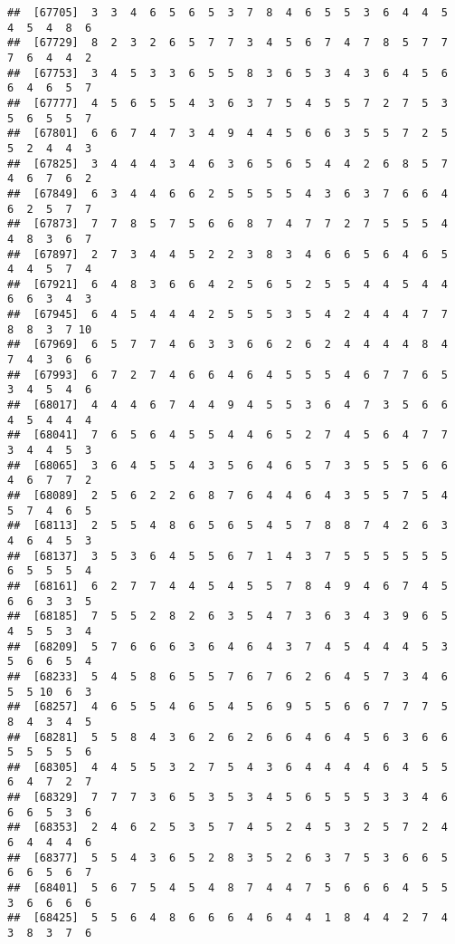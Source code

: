 \documentclass[
]{book}
\begin{document}
\begin{verbatim}
##  [67705]  3  3  4  6  5  6  5  3  7  8  4  6  5  5  3  6  4  4  5  4  5  4  8  6
##  [67729]  8  2  3  2  6  5  7  7  3  4  5  6  7  4  7  8  5  7  7  7  6  4  4  2
##  [67753]  3  4  5  3  3  6  5  5  8  3  6  5  3  4  3  6  4  5  6  6  4  6  5  7
##  [67777]  4  5  6  5  5  4  3  6  3  7  5  4  5  5  7  2  7  5  3  5  6  5  5  7
##  [67801]  6  6  7  4  7  3  4  9  4  4  5  6  6  3  5  5  7  2  5  5  2  4  4  3
##  [67825]  3  4  4  4  3  4  6  3  6  5  6  5  4  4  2  6  8  5  7  4  6  7  6  2
##  [67849]  6  3  4  4  6  6  2  5  5  5  5  4  3  6  3  7  6  6  4  6  2  5  7  7
##  [67873]  7  7  8  5  7  5  6  6  8  7  4  7  7  2  7  5  5  5  4  4  8  3  6  7
##  [67897]  2  7  3  4  4  5  2  2  3  8  3  4  6  6  5  6  4  6  5  4  4  5  7  4
##  [67921]  6  4  8  3  6  6  4  2  5  6  5  2  5  5  4  4  5  4  4  6  6  3  4  3
##  [67945]  6  4  5  4  4  4  2  5  5  5  3  5  4  2  4  4  4  7  7  8  8  3  7 10
##  [67969]  6  5  7  7  4  6  3  3  6  6  2  6  2  4  4  4  4  8  4  7  4  3  6  6
##  [67993]  6  7  2  7  4  6  6  4  6  4  5  5  5  4  6  7  7  6  5  3  4  5  4  6
##  [68017]  4  4  4  6  7  4  4  9  4  5  5  3  6  4  7  3  5  6  6  4  5  4  4  4
##  [68041]  7  6  5  6  4  5  5  4  4  6  5  2  7  4  5  6  4  7  7  3  4  4  5  3
##  [68065]  3  6  4  5  5  4  3  5  6  4  6  5  7  3  5  5  5  6  6  4  6  7  7  2
##  [68089]  2  5  6  2  2  6  8  7  6  4  4  6  4  3  5  5  7  5  4  5  7  4  6  5
##  [68113]  2  5  5  4  8  6  5  6  5  4  5  7  8  8  7  4  2  6  3  4  6  4  5  3
##  [68137]  3  5  3  6  4  5  5  6  7  1  4  3  7  5  5  5  5  5  5  6  5  5  5  4
##  [68161]  6  2  7  7  4  4  5  4  5  5  7  8  4  9  4  6  7  4  5  6  6  3  3  5
##  [68185]  7  5  5  2  8  2  6  3  5  4  7  3  6  3  4  3  9  6  5  4  5  5  3  4
##  [68209]  5  7  6  6  6  3  6  4  6  4  3  7  4  5  4  4  4  5  3  5  6  6  5  4
##  [68233]  5  4  5  8  6  5  5  7  6  7  6  2  6  4  5  7  3  4  6  5  5 10  6  3
##  [68257]  4  6  5  5  4  6  5  4  5  6  9  5  5  6  6  7  7  7  5  8  4  3  4  5
##  [68281]  5  5  8  4  3  6  2  6  2  6  6  4  6  4  5  6  3  6  6  5  5  5  5  6
##  [68305]  4  4  5  5  3  2  7  5  4  3  6  4  4  4  4  6  4  5  5  6  4  7  2  7
##  [68329]  7  7  7  3  6  5  3  5  3  4  5  6  5  5  5  3  3  4  6  6  6  5  3  6
##  [68353]  2  4  6  2  5  3  5  7  4  5  2  4  5  3  2  5  7  2  4  6  4  4  4  6
##  [68377]  5  5  4  3  6  5  2  8  3  5  2  6  3  7  5  3  6  6  5  6  6  5  6  7
##  [68401]  5  6  7  5  4  5  4  8  7  4  4  7  5  6  6  6  4  5  5  3  6  6  6  6
##  [68425]  5  5  6  4  8  6  6  6  4  6  4  4  1  8  4  4  2  7  4  3  8  3  7  6

\end{verbatim}
\end{document}
